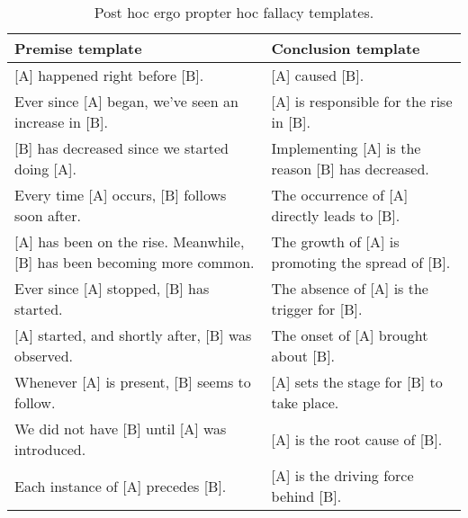 \begin{appendix}
        \begin{table}
            \footnotesize
            \centering
            \renewcommand{\arraystretch}{1.5}
            \begin{tabularx}{\textwidth}{XX}
                \toprule
                 \textbf{Premise template} & \textbf{Conclusion template}\\
                 \midrule
                 {[A] happened right before [B].} & {[A] caused [B].}\\
                 {Ever since [A] began, we've seen an increase in [B].} & {[A] is responsible for the rise in [B].}\\
                 {[B] has decreased since we started doing [A].} & {Implementing [A] is the reason [B] has decreased.}\\
                 {Every time [A] occurs, [B] follows soon after.} & {The occurrence of [A] directly leads to [B].}\\
                 {[A] has been on the rise. Meanwhile, [B] has been becoming more common.} & {The growth of [A] is promoting the spread of [B].}\\
                 {Ever since [A] stopped, [B] has started.} & {The absence of [A] is the trigger for [B].}\\
                 {[A] started, and shortly after, [B] was observed.} & {The onset of [A] brought about [B].}\\
                 {Whenever [A] is present, [B] seems to follow.} & {[A] sets the stage for [B] to take place.}\\
                 {We did not have [B] until [A] was introduced.} & {[A] is the root cause of [B].}\\
                 {Each instance of [A] precedes [B].} & {[A] is the driving force behind [B].}\\
                 \bottomrule
            \end{tabularx}
            \caption{Post hoc ergo propter hoc fallacy templates.}
            \label{tab:phepc-template}
        \end{table}


\end{appendix}
